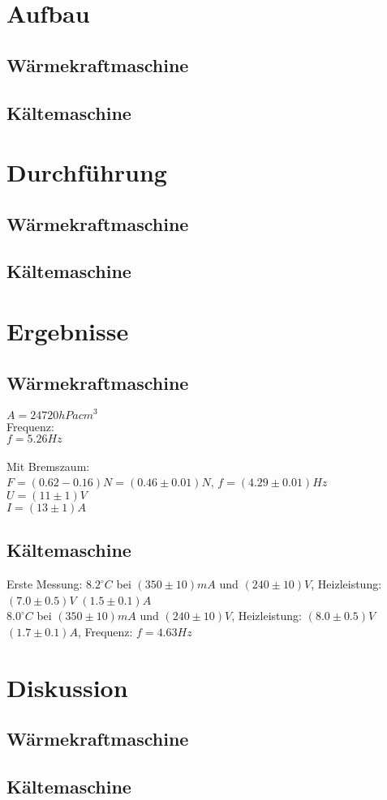 \documentclass[12pt,a4paper,twopage]{article}
\begin{document}
\section{Aufbau}
\subsection{Wärmekraftmaschine}
\subsection{Kältemaschine}

\section{Durchführung}

\subsection{Wärmekraftmaschine}
\subsection{Kältemaschine}

\section{Ergebnisse}
\subsection{Wärmekraftmaschine}
$A=24720hPa cm^3$\\
Frequenz:\\
$f=5.26Hz$\\
\\
Mit Bremszaum:\\
$F=(0.62-0.16)N=(0.46 \pm 0.01)N$, $f=(4.29 \pm 0.01)Hz$\\

$U=(11 \pm 1)V$\\
$I=(13 \pm 1)A$\\

\subsection{Kältemaschine}
Erste Messung:
$8.2^\circ C$ bei $(350 \pm 10)mA$ und $(240 \pm 10)V$, Heizleistung: $(7.0 \pm 0.5)V$ $(1.5 \pm 0.1)A$\\


$8.0^\circ C$ bei $(350 \pm 10)mA$ und $(240 \pm 10)V$, Heizleistung: $(8.0 \pm 0.5)V$ $(1.7 \pm 0.1)A$, Frequenz: $f=4.63Hz$\\

\section{Diskussion}
\subsection{Wärmekraftmaschine}
\subsection{Kältemaschine}
																								
\end{document}
